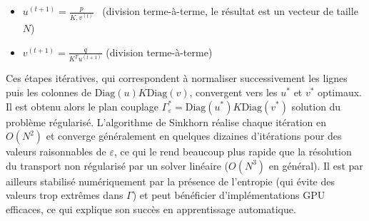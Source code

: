 \begin{itemize}
    \item $\displaystyle u^{(t+1)} = \frac{p}{K,v^{(t)}}$  (division terme-à-terme, le résultat est un vecteur de taille $N$)
    \item $\displaystyle v^{(t+1)} =  \frac{q}{K^T u^{(t+1)}}$  (division terme-à-terme)
\end{itemize}

Ces étapes itératives, qui correspondent à normaliser successivement les lignes puis les colonnes de $\mathrm{Diag}(u)K\mathrm{Diag}(v)$, convergent vers les $u^*$ et $v^*$ optimaux. Il est obtenu alors le plan couplage $\Gamma^*_{\varepsilon} = \mathrm{Diag}(u^*)K\mathrm{Diag}(v^*)$ solution du problème régularisé. L’algorithme de Sinkhorn réalise chaque itération en $O(N^2)$ et converge généralement en quelques dizaines d’itérations pour des valeurs raisonnables de $\varepsilon$, ce qui le rend beaucoup plus rapide que la résolution du transport non régularisé par un solver linéaire ($O(N^3)$ en général). Il est par ailleurs stabilisé numériquement par la présence de l’entropie (qui évite des valeurs trop extrêmes dans $\Gamma$) et peut bénéficier d’implémentations GPU efficaces, ce qui explique son succès en apprentissage automatique.\\

